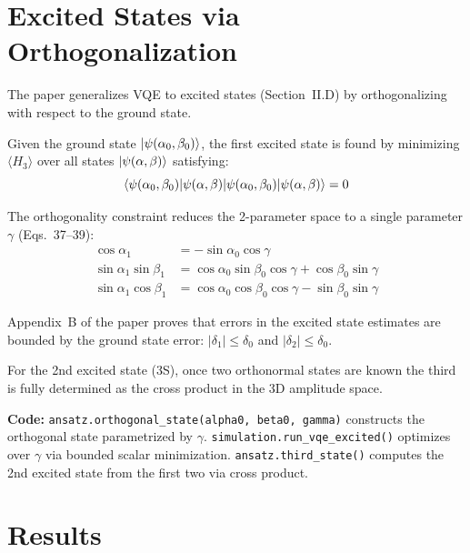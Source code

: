 \documentclass[11pt,a4paper]{article}
\begin{document}
\section{Excited States via Orthogonalization}

The paper generalizes VQE to excited states (Section~II.D) by orthogonalizing with respect to the ground state.

Given the ground state $\ket{\psi(\alpha_0, \beta_0)}$, the first excited state is found by minimizing $\langle H_3 \rangle$ over all states $\ket{\psi(\alpha, \beta)}$ satisfying:
\begin{equation}
  \braket{\psi(\alpha_0, \beta_0)|\psi(\alpha, \beta)} = 0
\end{equation}

The orthogonality constraint reduces the 2-parameter space to a single parameter $\gamma$ (Eqs.~37--39):
\begin{align}
  \cos\alpha_1 &= -\sin\alpha_0 \cos\gamma \\
  \sin\alpha_1 \sin\beta_1 &= \cos\alpha_0 \sin\beta_0 \cos\gamma + \cos\beta_0 \sin\gamma \\
  \sin\alpha_1 \cos\beta_1 &= \cos\alpha_0 \cos\beta_0 \cos\gamma - \sin\beta_0 \sin\gamma
\end{align}

Appendix~B of the paper proves that errors in the excited state estimates are bounded by the ground state error: $|\delta_1| \leq \delta_0$ and $|\delta_2| \leq \delta_0$.

For the 2nd excited state (3S), once two orthonormal states are known the third is fully determined as the cross product in the 3D amplitude space.

\vspace{0.3em}
\noindent\textbf{Code:} \texttt{ansatz.orthogonal\_state(alpha0, beta0, gamma)} constructs the orthogonal state parametrized by $\gamma$. \texttt{simulation.run\_vqe\_excited()} optimizes over $\gamma$ via bounded scalar minimization. \texttt{ansatz.third\_state()} computes the 2nd excited state from the first two via cross product.


\section{Results}
\end{document}

